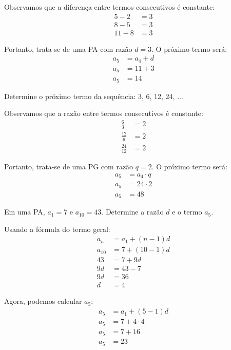 \documentclass[12pt,a4paper]{article}
\begin{document}
\begin{tcolorbox}[colback=green!5!white,colframe=green!75!black,title=Resolução]
Observamos que a diferença entre termos consecutivos é constante:
\begin{align}
5 - 2 &= 3\\
8 - 5 &= 3\\
11 - 8 &= 3
\end{align}

Portanto, trata-se de uma PA com razão $d = 3$. O próximo termo será:
\begin{align}
a_5 &= a_4 + d\\
a_5 &= 11 + 3\\
a_5 &= 14
\end{align}
\end{tcolorbox}

\begin{tcolorbox}[colback=blue!5!white,colframe=blue!75!black,title=Exercício B2]
Determine o próximo termo da sequência: 3, 6, 12, 24, ...
\end{tcolorbox}

\begin{tcolorbox}[colback=green!5!white,colframe=green!75!black,title=Resolução]
Observamos que a razão entre termos consecutivos é constante:
\begin{align}
\frac{6}{3} &= 2\\
\frac{12}{6} &= 2\\
\frac{24}{12} &= 2
\end{align}

Portanto, trata-se de uma PG com razão $q = 2$. O próximo termo será:
\begin{align}
a_5 &= a_4 \cdot q\\
a_5 &= 24 \cdot 2\\
a_5 &= 48
\end{align}
\end{tcolorbox}

\begin{tcolorbox}[colback=blue!5!white,colframe=blue!75!black,title=Exercício B3]
Em uma PA, $a_1 = 7$ e $a_{10} = 43$. Determine a razão $d$ e o termo $a_5$.
\end{tcolorbox}

\begin{tcolorbox}[colback=green!5!white,colframe=green!75!black,title=Resolução]
Usando a fórmula do termo geral:
\begin{align}
a_n &= a_1 + (n-1)d\\
a_{10} &= 7 + (10-1)d\\
43 &= 7 + 9d\\
9d &= 43 - 7\\
9d &= 36\\
d &= 4
\end{align}

Agora, podemos calcular $a_5$:
\begin{align}
a_5 &= a_1 + (5-1)d\\
a_5 &= 7 + 4 \cdot 4\\
a_5 &= 7 + 16\\
a_5 &= 23
\end{align}
\end{tcolorbox}
\end{document}

